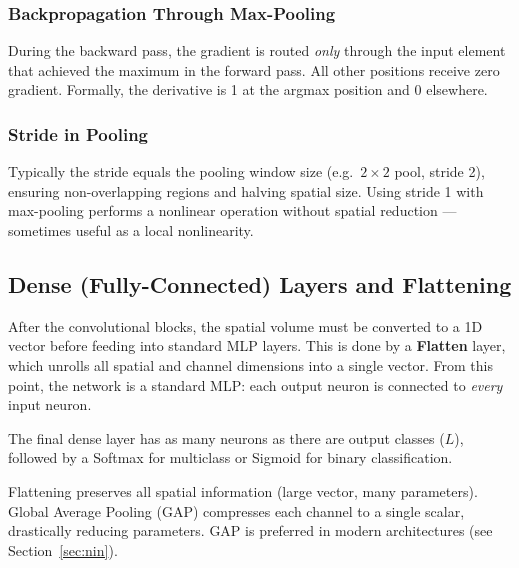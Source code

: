 \documentclass[11pt,a4paper]{article}
\newcommand{\term}[1]{\textcolor{DefGreen}{\textbf{#1}}\index{#1}}
\begin{document}
\subsubsection{Backpropagation Through Max-Pooling}

During the backward pass, the gradient is routed \emph{only} through the input element that achieved the maximum in the forward pass. All other positions receive zero gradient. Formally, the derivative is 1 at the argmax position and 0 elsewhere.

\subsubsection{Stride in Pooling}

Typically the stride equals the pooling window size (e.g.\ $2\times2$ pool, stride 2), ensuring non-overlapping regions and halving spatial size. Using stride 1 with max-pooling performs a nonlinear operation without spatial reduction — sometimes useful as a local nonlinearity.

\subsection{Dense (Fully-Connected) Layers and Flattening}

After the convolutional blocks, the spatial volume must be converted to a 1D vector before feeding into standard MLP layers. This is done by a \term{Flatten} layer, which unrolls all spatial and channel dimensions into a single vector. From this point, the network is a standard MLP: each output neuron is connected to \emph{every} input neuron.

The final dense layer has as many neurons as there are output classes ($L$), followed by a Softmax for multiclass or Sigmoid for binary classification.

\begin{notebox}
Flattening preserves all spatial information (large vector, many parameters). Global Average Pooling (GAP) compresses each channel to a single scalar, drastically reducing parameters. GAP is preferred in modern architectures (see Section~\ref{sec:nin}).
\end{notebox}
\end{document}
